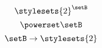 \begin{forslides}
    \begin{equation}\label{eq:slides_session2_195}
        \stylesets{2}^\setB
    \end{equation}
    \begin{equation}\label{eq:slides_session2_196}
        \powerset \setB
    \end{equation}
    \begin{equation}\label{eq:slides_session2_197}
        \setB \to \stylesets{2}
    \end{equation}

\end{forslides}
